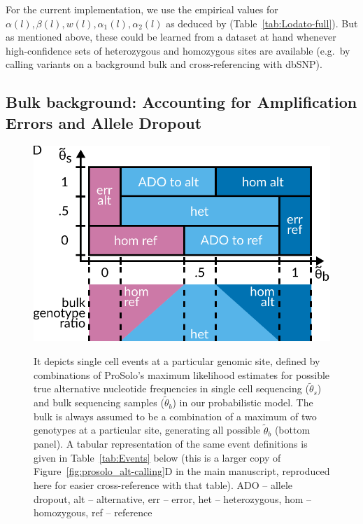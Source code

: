 \documentclass[authoryear,preprint,11pt]{scrartcl}
\begin{document}
For the current implementation, we use the empirical values for $\alpha(l), \beta(l), w(l), \alpha_1(l), \alpha_2(l)$ as deduced by \cite{lodato_somatic_2015} (Table~\ref{tab:Lodato-full}).
But as mentioned above, these could be learned from a dataset at hand whenever high-confidence sets of heterozygous and homozygous sites are available (e.g.~by calling variants on a background bulk and cross-referencing with dbSNP).\\

\subsection{Bulk background: Accounting for Amplification Errors and Allele Dropout}

\begin{figure}[tbp]
 \includegraphics[width=.7\linewidth]{figs/Event_space.pdf}\\
 \caption{
  It depicts single cell events at a particular genomic site, defined by combinations of ProSolo's maximum likelihood estimates for possible true alternative nucleotide frequencies in single cell sequencing ($\tilde{\theta}_s$) and bulk sequencing samples ($\tilde{\theta}_b$) in our probabilistic model.
  The bulk is always assumed to be a combination of a maximum of two genotypes at a particular site, generating all possible $\tilde{\theta}_b$ (bottom panel).
  A tabular representation of the same event definitions is given in Table~\ref{tab:Events} below (this is a larger copy of Figure~\ref{fig:prosolo_alt-calling}D in the main manuscript, reproduced  here for easier cross-reference with that table).\footnotesize\newline
  ADO -- allele dropout, alt -- alternative, err -- error, het -- heterozygous, hom -- homozygous, ref -- reference
  }
 \label{fig:event-space}
\end{figure}
\end{document}
